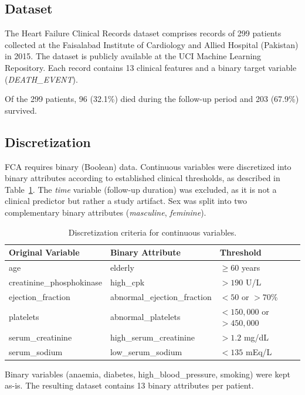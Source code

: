 \documentclass[a4paper,twoside]{article}
\begin{document}
\subsection{Dataset}

The Heart Failure Clinical Records dataset \cite{Chicco2020} comprises records of 299 patients collected at the Faisalabad Institute of Cardiology and Allied Hospital (Pakistan) in 2015. The dataset is publicly available at the UCI Machine Learning Repository. Each record contains 13 clinical features and a binary target variable (\textit{DEATH\_EVENT}).

Of the 299 patients, 96 (32.1\%) died during the follow-up period and 203 (67.9\%) survived.

\subsection{Discretization}

FCA requires binary (Boolean) data. Continuous variables were discretized into binary attributes according to established clinical thresholds, as described in Table~\ref{tab:discretization}. The \textit{time} variable (follow-up duration) was excluded, as it is not a clinical predictor but rather a study artifact. Sex was split into two complementary binary attributes (\textit{masculine}, \textit{feminine}).

\begin{table}[h]
\caption{Discretization criteria for continuous variables.}
\label{tab:discretization}
\centering
\small
\begin{tabular}{|l|l|l|}
\hline
\textbf{Original Variable} & \textbf{Binary Attribute} & \textbf{Threshold} \\
\hline
age & elderly & $\geq 60$ years \\
creatinine\_phosphokinase & high\_cpk & $> 190$ U/L \\
ejection\_fraction & abnormal\_ejection\_fraction & $< 50$ or $> 70$\% \\
platelets & abnormal\_platelets & $< 150{,}000$ or $> 450{,}000$ \\
serum\_creatinine & high\_serum\_creatinine & $> 1.2$ mg/dL \\
serum\_sodium & low\_serum\_sodium & $< 135$ mEq/L \\
\hline
\end{tabular}
\end{table}

Binary variables (anaemia, diabetes, high\_blood\_pressure, smoking) were kept as-is. The resulting dataset contains 13 binary attributes per patient.
\end{document}
